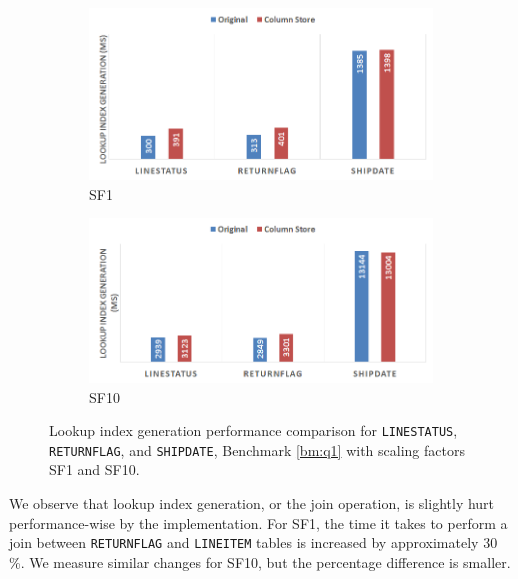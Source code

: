 \begin{figure}
    \centering
    \begin{subfigure}{0.9\textwidth}
        \includegraphics[width=\textwidth]{img/column-store-lig-sf001.png}
        \caption{SF1}
    \end{subfigure}
    \begin{subfigure}{0.9\textwidth}
        \includegraphics[width=\textwidth]{img/column-store-lig.png}
        \caption{SF10}
    \end{subfigure}
    \caption{Lookup index generation performance comparison for \texttt{LINESTATUS}, \texttt{RETURNFLAG}, and \texttt{SHIPDATE}, Benchmark \ref{bm:q1} with scaling factors SF1 and SF10.}
    \label{fig:column-store-lig}
\end{figure}
We observe that lookup index generation, or the join operation, is slightly hurt performance-wise by the  implementation. For SF1, the time it takes to perform a join between \texttt{RETURNFLAG} and \texttt{LINEITEM} tables is increased by approximately 30 \%. We measure similar changes for SF10, but the percentage difference is smaller.

